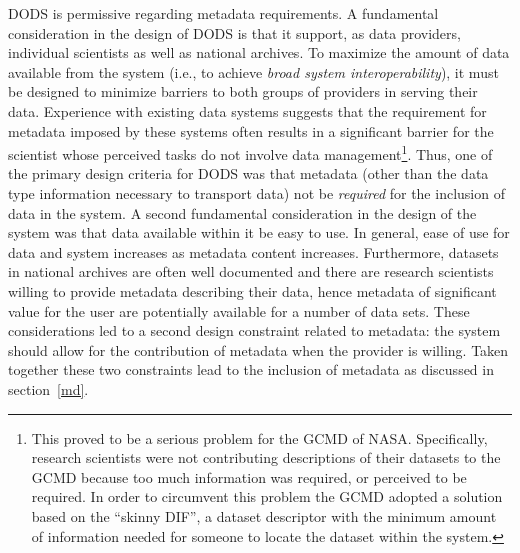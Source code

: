 \documentclass[12pt]{article}
\begin{document}
\ac{DODS} is permissive regarding metadata requirements. A fundamental
consideration in the design of \ac{DODS} is that it support, as data
providers, individual scientists as well as national archives.  To maximize
the amount of data available from the system (i.e., to achieve \emph{broad
system interoperability}), it must be designed to minimize barriers
to both groups of providers in serving their data. Experience with existing
data systems suggests that the requirement for metadata imposed by these
systems often results in a significant barrier for the scientist whose
perceived tasks do not involve data management\footnote{This proved to be a
  serious problem for the \ac{GCMD} of \acs{NASA}. Specifically, research
  scientists were not contributing descriptions of their datasets to the
  \ac{GCMD} because too much information was required, or perceived to be
  required. In order to circumvent this problem the \ac{GCMD} adopted a
  solution based on the ``skinny \acs{DIF}'', a dataset descriptor with the
  minimum amount of information needed for someone to locate the dataset
  within the system.}. Thus, one of the primary design criteria for \ac{DODS}
was that metadata (other than the data type information necessary to
transport data) not be \emph{required} for the inclusion of data in the
system. A second fundamental consideration in the design of the system was
that data available within it be easy to use. In general, ease of
use for data and system increases as metadata content increases. Furthermore, datasets in
national archives are often well documented and there are research scientists
willing to provide metadata describing their data, hence metadata of
significant value for the user are potentially available for a number of data
sets. These considerations led to a second design constraint related to
metadata: the system should allow for the contribution of metadata when the
provider is willing. Taken together these two constraints lead to the
inclusion of metadata as discussed in section~\ref{md}.
\end{document}

